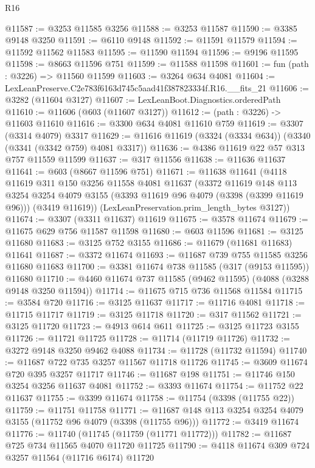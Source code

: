 \begin{lexlean}{R16}
\begin{coremodule}
@11587 := @3253 @11585 @3256
@11588 := @3253 @11587
@11590 := @3385 @9148 @3250
@11591 := @6110 @9148
@11592 := @11591 @11579
@11594 := @11592 @11562 @11583
@11595 := @11590 @11594
@11596 := @9196 @11595
@11598 := @8663 @11596 @751
@11599 := @11588 @11598
@11601 := fun (path : @3226) => @11560 @11599
@11603 := @3264 @634 @4081
@11604 := LexLeanPreserve.C2e783f6163d745c5aad41f387823334f.R16.__fits_21
@11606 := @3282 (@11604 @3127)
@11607 := LexLeanBoot.Diagnostics.orderedPath
@11610 := @11606 (@603 (@11607 @3127))
@11612 := (path : @3226) -> @11603 @11610
@11616 := @3300 @634 @4081 @11610 @759
@11619 := @3307 (@3314 @4079) @3317
@11629 := @11616 @11619 (@3324 (@3334 @634)) (@3340 (@3341 (@3342 @759) @4081 @3317))
@11636 := @4386 @11619 @22 @57 @313 @757 @11559 @11599
@11637 := @317 @11556
@11638 := @11636 @11637
@11641 := @603 (@8667 @11596 @751)
@11671 := @11638
    @11641
    (@4118
      @11619
      @311
      @150
      @3256
      @11558
      @4081
      @11637
      (@3372
        @11619
        @148
        @113
        @3254
        @3254
        @4079
        @3155
        (@3393 @11619 @96 @4079 (@3398 (@3399 @11619 @96)))
        (@3419 @11619))
      (LexLeanPreservation.prim_length_bytes @3127))
@11674 := @3307 (@3311 @11637) @11619
@11675 := @3578 @11674
@11679 := @11675 @629 @756 @11587 @11598
@11680 := @603 @11596
@11681 := @3125 @11680
@11683 := @3125 @752 @3155
@11686 := @11679 (@11681 @11683) @11641
@11687 := @3372 @11674
@11693 := @11687 @739 @755 @11585 @3256 @11680 @11683
@11700 := @3381 @11674 @738 @11585 (@317 (@9153 @11595)) @11680
@11710 := @4460 @11674 @737 @11585 (@9462 @11595) (@4088 (@3288 @9148 @3250 @11594))
@11714 := @11675 @715 @736 @11568 @11584
@11715 := @3584 @720
@11716 := @3125 @11637
@11717 := @11716 @4081
@11718 := @11715 @11717
@11719 := @3125 @11718
@11720 := @317 @11562
@11721 := @3125 @11720
@11723 := @4913 @614 @611
@11725 := @3125 @11723 @3155
@11726 := @11721 @11725
@11728 := @11714 (@11719 @11726)
@11732 := @3272 @9148 @3250 @9462 @4088
@11734 := @11728 (@11732 @11594)
@11740 := @11687 @722 @735 @3257 @11567 @11718 @11726
@11745 := @3609 @11674 @720 @395 @3257 @11717
@11746 := @11687 @198
@11751 := @11746 @150 @3254 @3256 @11637 @4081
@11752 := @3393 @11674
@11754 := @11752 @22 @11637
@11755 := @3399 @11674
@11758 := @11754 (@3398 (@11755 @22))
@11759 := @11751 @11758
@11771 := @11687 @148 @113 @3254 @3254 @4079 @3155 (@11752 @96 @4079 (@3398 (@11755 @96)))
@11772 := @3419 @11674
@11776 := @11740 (@11745 (@11759 (@11771 @11772)))
@11782 := @11687 @725 @734 @11565 @4070 @11720 @11725
@11790 := @4118 @11674 @309 @724 @3257 @11564 (@11716 @6174) @11720

\end{coremodule}
\end{lexlean}
